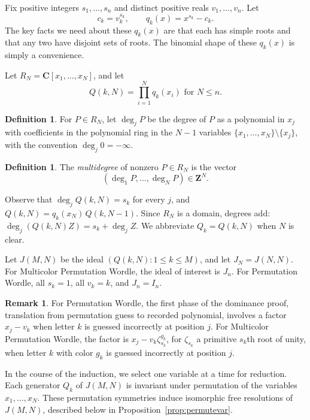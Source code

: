 \documentclass[12pt]{amsart}
\theoremstyle{definition}
\newtheorem{definition1}[theorem]{Definition}
\newtheorem{remark1}[theorem]{Remark}
\theoremstyle{remark}
\newcommand\classic{Permutation Wordle\xspace}
\newcommand\rainbow{Multicolor Permutation Wordle\xspace}
\newcommand{\BC}{\mathbf C}
\newcommand{\Z}{\mathbf Z}
\begin{document}
Fix positive integers $s_1,\ldots, s_n$ and
distinct positive reals $v_1,\ldots, v_n$.
Let
\begin{equation}\label{eq:littleQconstruct}
c_k=v_k^{s_k}, \qquad q_k(x)=x^{s_k}-c_k.
\end{equation}
The key facts we need about these $q_k(x)$ are that each has
simple roots and that any two have disjoint sets of roots.  The binomial shape of these $q_k(x)$
is simply a convenience.

Let $R_N = \BC[x_1, \ldots, x_N]$, and let
\begin{equation}\label{eq:bigQconstruct}
Q(k,N)=\prod_{i=1}^N q_k(x_i) \text{ for } N \leq n.
\end{equation}
\begin{definition1}
For $P \in R_N$, let $\deg_j P$ be the degree of $P$ as a polynomial in $x_j$
with coefficients in the polynomial ring in the $N-1$ variables
$\{x_1, \ldots, x_N\} \setminus \{x_j\}$, with the convention $\deg_j 0 = -\infty$.
\end{definition1}

\begin{definition1}
The \emph{multidegree} of nonzero $P\in R_N$ is the vector
\[ (\deg_1 P, \ldots, \deg_N P ) \in \Z^N. \]
\end{definition1}

Observe that
$\deg_jQ(k,N)=s_k$ for every $j$, and $Q(k,N)=q_k(x_N)\,Q(k,N-1)$.
Since $R_N$ is a domain,
degrees add: $\deg_j(Q(k,N)Z)=s_k+\deg_jZ$.
We abbreviate $Q_k=Q(k,N)$ when $N$ is clear.

Let $J(M, N)$ be the ideal $(Q(k, N) : 1 \leq k \leq M)$, and let $J_N = J(N, N)$.
For \rainbow, the ideal of interest is $J_n$.
For \classic, all $s_k = 1$, all $v_k = k$, and $J_n = I_n$.

\begin{remark1}\label{rem:translate}
For \classic, the first phase of the dominance proof, translation
from permutation guess to recorded polynomial,
involves a factor $x_j - v_k$ when letter $k$ is guessed incorrectly at
position $j$.  For \rainbow, the factor is $x_j - v_k\zeta_{s_k}^{g_k}$,
for $\zeta_{s_k}$ a primitive $s_k$th root of unity,
when letter $k$ with color $g_k$ is guessed incorrectly at position $j$.
\end{remark1}

In the course of the induction, we select one variable at a time for
reduction.  
Each generator $Q_k$ of $J(M, N)$ is invariant under
permutation of the variables $x_1, \ldots, x_N$.
These permutation symmetries induce isomorphic
free resolutions of $J(M, N)$,
described below in Proposition~\ref{prop:permutevar}.
\end{document}
